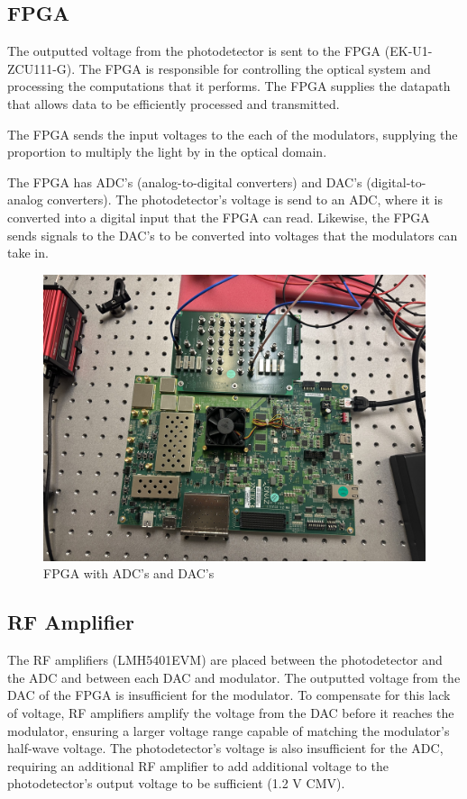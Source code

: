 \documentclass[11pt]{article}
\begin{document}
\subsection{FPGA}

The outputted voltage from the photodetector is sent to the FPGA (EK-U1-ZCU111-G). The FPGA is responsible for controlling the optical system and processing the computations that it performs. The FPGA supplies the datapath that allows  data to be efficiently processed and transmitted.

The FPGA sends the input voltages to the each of the modulators, supplying the proportion to multiply the light by in the optical domain. 

The FPGA has ADC's (analog-to-digital converters) and DAC's (digital-to-analog converters). The photodetector's voltage is send to an ADC, where it is converted into a digital input that the FPGA can read. Likewise, the FPGA sends signals to the DAC's to be converted into voltages that the modulators can take in.

\begin{figure}[H]
    \centering
    \includegraphics[width=0.5\linewidth]{fpga.jpg}
    \caption{FPGA with ADC's and DAC's}
    \label{fig:enter-label}
\end{figure}

\subsection{RF Amplifier}

The RF amplifiers (LMH5401EVM) are placed between the photodetector and the ADC and between each DAC and modulator. The outputted voltage from the DAC of the FPGA is insufficient for the modulator. To compensate for this lack of voltage, RF amplifiers amplify the voltage from the DAC before it reaches the modulator, ensuring a larger voltage range capable of matching the modulator's half-wave voltage. The photodetector's voltage is also insufficient for the ADC, requiring an additional RF amplifier to add additional voltage to the photodetector's output voltage to be sufficient (1.2 V CMV).
\end{document}
